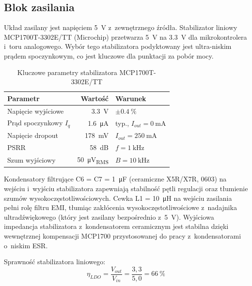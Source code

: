 \documentclass[a4paper,11pt]{article}
\begin{document}
\subsection{Blok zasilania}
\label{sec:zasilanie}

Układ zasilany jest napięciem \SI{5}{\volt} z~zewnętrznego źródła.
Stabilizator liniowy MCP1700T-3302E/TT (Microchip) przetwarza
\SI{5}{\volt} na \SI{3,3}{\volt} dla mikrokontrolera i~toru analogowego.
Wybór tego stabilizatora podyktowany jest ultra-niskim prądem spoczynkowym,
co jest kluczowe dla punktacji za pobór mocy.

\begin{table}[H]
    \centering
    \caption{Kluczowe parametry stabilizatora MCP1700T-3302E/TT}
    \label{tab:mcp1700}
    \begin{tabular}{lrl}
        \toprule
        \textbf{Parametr} & \textbf{Wartość} & \textbf{Warunek} \\
        \midrule
        Napięcie wyjściowe & \SI{3,3}{\volt} & $\pm\SI{0,4}{\percent}$ \\
        Prąd spoczynkowy $I_q$ & \SI{1,6}{\micro\ampere} & typ., $I_{out} = \SI{0}{\milli\ampere}$ \\
        Napięcie dropout & \SI{178}{\milli\volt} & $I_{out} = \SI{250}{\milli\ampere}$ \\
        PSRR & \SI{58}{\deci\bel} & $f = \SI{1}{\kilo\hertz}$ \\
        Szum wyjściowy & \SI{50}{\micro\volt_{RMS}} & $B = \SI{10}{\kilo\hertz}$ \\
        \bottomrule
    \end{tabular}
\end{table}

Kondensatory filtrujące C6 = C7 = \SI{1}{\micro\farad} (ceramiczne X5R/X7R, 0603)
na wejściu i~wyjściu stabilizatora zapewniają stabilność pętli regulacji
oraz tłumienie szumów wysokoczęstotliwościowych. Cewka L1 = \SI{10}{\micro\henry}
na wejściu zasilania pełni rolę filtru EMI, tłumiąc zakłócenia
wysokoczęstotliwościowe z~nadajnika ultradźwiękowego (który jest zasilany
bezpośrednio z~\SI{5}{\volt}). Wyjściowa impedancja
stabilizatora z~kondensatorem ceramicznym jest stabilna dzięki wewnętrznej
kompensacji MCP1700 przystosowanej do pracy z~kondensatorami o~niskim ESR.

Sprawność stabilizatora liniowego:
\begin{equation}
    \eta_{LDO} = \frac{V_{out}}{V_{in}} = \frac{3{,}3}{5{,}0} = \SI{66}{\percent}
    \label{eq:sprawnosc_ldo}
\end{equation}
\end{document}
